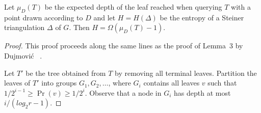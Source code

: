 \documentclass{patmorin}
\begin{document}
\begin{lem}
Let $\mu_D(T)$ be the expected depth of the leaf reached when querying $T$
with a point drawn according to $D$ and let $H=H(\Delta)$ be the entropy
of a Steiner triangulation $\Delta$ of $G$.  Then $H = \Omega(\mu_D(T)
- 1)$.
\end{lem}

\begin{proof}
This proof proceeds along the same lines as the proof of Lemma~3 by Dujmovi\'c \etal\ \cite{dXX}.

Let $T'$ be the tree obtained from $T$ by removing all terminal leaves.
Partition the leaves of $T'$ into groups $G_1,G_2,\ldots$, where $G_i$ contains
all leaves $v$ such that $1/2^{i-1} \ge \Pr(v) \ge 1/2^{i}$.  Observe that a
node in $G_i$ has depth at most $i/(log_2 r-1)$.

\end{proof}



\end{document}
